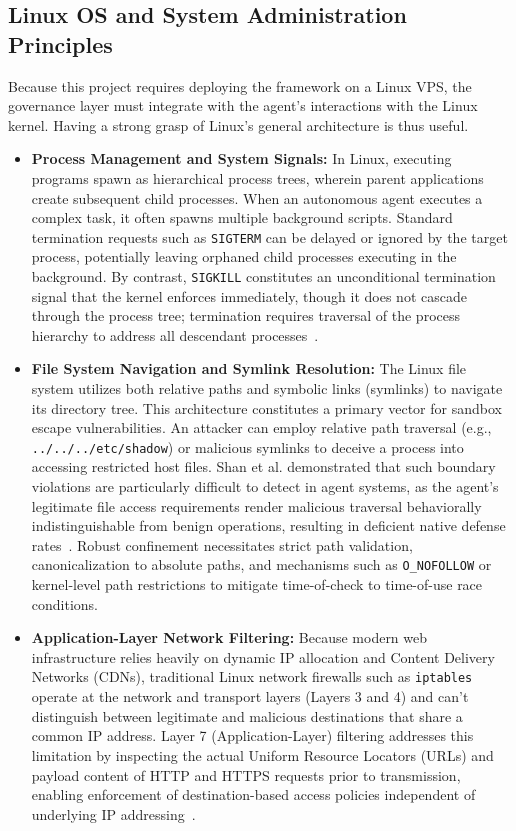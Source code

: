 \documentclass[a4paper]{report}
\begin{document}
\subsection{Linux OS and System Administration Principles}

Because this project requires deploying the framework on a Linux VPS, the governance layer must integrate with the agent's interactions with the Linux kernel. Having a strong grasp of Linux's general architecture is thus useful.
\begin{itemize}
    \item \textbf{Process Management and System Signals:} In Linux, executing programs spawn as hierarchical process trees, wherein parent applications create subsequent child processes. When an autonomous agent executes a complex task, it often spawns multiple background scripts. Standard termination requests such as \texttt{SIGTERM} can be delayed or ignored by the target process, potentially leaving orphaned child processes executing in the background. By contrast, \texttt{SIGKILL} constitutes an unconditional termination signal that the kernel enforces immediately, though it does not cascade through the process tree; termination requires traversal of the process hierarchy to address all descendant processes~\cite{sharma2025agentic, shan2025dont}.

    \item \textbf{File System Navigation and Symlink Resolution:} The Linux file system utilizes both relative paths and symbolic links (symlinks) to navigate its directory tree. This architecture constitutes a primary vector for sandbox escape vulnerabilities. An attacker can employ relative path traversal (e.g., \texttt{../../../etc/shadow}) or malicious symlinks to deceive a process into accessing restricted host files. Shan et al. demonstrated that such boundary violations are particularly difficult to detect in agent systems, as the agent's legitimate file access requirements render malicious traversal behaviorally indistinguishable from benign operations, resulting in deficient native defense rates~\cite{shan2025dont}. Robust confinement necessitates strict path validation, canonicalization to absolute paths, and mechanisms such as \texttt{O\_NOFOLLOW} or kernel-level path restrictions to mitigate time-of-check to time-of-use race conditions.

    \item \textbf{Application-Layer Network Filtering:} Because modern web infrastructure relies heavily on dynamic IP allocation and Content Delivery Networks (CDNs), traditional Linux network firewalls such as \texttt{iptables} operate at the network and transport layers (Layers 3 and 4) and can't distinguish between legitimate and malicious destinations that share a common IP address. Layer 7 (Application-Layer) filtering addresses this limitation by inspecting the actual Uniform Resource Locators (URLs) and payload content of HTTP and HTTPS requests prior to transmission, enabling enforcement of destination-based access policies independent of underlying IP addressing~\cite{foerster2026camels, anonymous2026systematic}.


\end{itemize}
\end{document}
